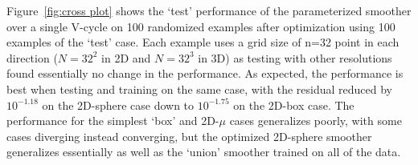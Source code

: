 \documentclass[review]{elsarticle}
\begin{document}
Figure~\ref{fig:cross plot} shows the `test' performance of the parameterized smoother over a single V-cycle on 100 randomized examples after optimization using 100 examples of the `test' case. Each example uses a grid size of n=32 point in each direction ($N=32^2$ in 2D and $N=32^3$ in 3D) as testing with other resolutions found essentially no change in the performance. As expected, the performance is best when testing and training on the same case, with the residual reduced by $10^{-1.18}$ on the 2D-sphere case down to $10^{-1.75}$ on the 2D-box case. The performance for the simplest `box' and 2D-$\mu$ cases generalizes poorly, with some cases diverging instead converging, but the optimized 2D-sphere smoother generalizes essentially as well as the `union' smoother trained on all of the data. 
\end{document}

